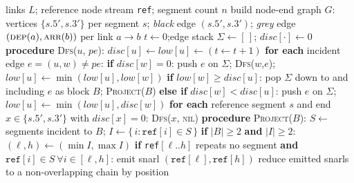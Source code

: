 \begin{algorithm}[t]
  \caption{Top-level snarl extraction via biconnected decomposition}
  \label{alg:ce-bcc}
  \begin{algorithmic}[1]
    \REQUIRE links $L$; reference node stream \texttt{ref}; segment count $n$
    \STATE build node-end graph $G$: vertices $\{s.5',s.3'\}$ per segment $s$;
           \emph{black} edge $(s.5',s.3')$; \emph{grey} edge
           $(\textsc{dep}(a),\textsc{arr}(b))$ per link $a{\to}b$
    \STATE $t \gets 0$;\quad edge stack $\Sigma \gets [\,]$;\quad
           $\textit{disc}[\cdot]\gets 0$
    \STATE \textbf{procedure} \textsc{Dfs}($u$, $\textit{pe}$): 
    \STATE \quad $\textit{disc}[u]\gets\textit{low}[u]\gets (t\gets t{+}1)$
    \STATE \quad \textbf{for each} incident edge $e=(u,w)\neq \textit{pe}$:
    \STATE \qquad \textbf{if} $\textit{disc}[w]=0$: \quad push $e$ on $\Sigma$;\;
           \textsc{Dfs}($w$,$e$);\;
           $\textit{low}[u]\gets\min(\textit{low}[u],\textit{low}[w])$
    \STATE \qquad\quad \textbf{if} $\textit{low}[w]\ge\textit{disc}[u]$:
           pop $\Sigma$ down to and including $e$ as block $B$;\; \textsc{Project}($B$)
    \STATE \qquad \textbf{else if} $\textit{disc}[w]<\textit{disc}[u]$:
           push $e$ on $\Sigma$;\; $\textit{low}[u]\gets\min(\textit{low}[u],\textit{disc}[w])$
    \STATE \textbf{for each} reference segment $s$ and end $x\in\{s.5',s.3'\}$ with $\textit{disc}[x]=0$: \textsc{Dfs}($x$, \textsc{nil})
    \STATE \textbf{procedure} \textsc{Project}($B$):
    \STATE \quad $S \gets$ segments incident to $B$;\quad
           $I \gets \{\,i : \texttt{ref}[i]\in S\,\}$
    \STATE \quad \textbf{if} $|B|\ge 2$ \textbf{and} $|I|\ge 2$:
           $(\ell,h)\gets(\min I,\max I)$
    \STATE \qquad \textbf{if} \texttt{ref}$[\ell..h]$ repeats no segment \textbf{and}
           $\texttt{ref}[i]\in S\ \forall i\in[\ell,h]$:
           emit snarl $(\texttt{ref}[\ell],\texttt{ref}[h])$
    \STATE reduce emitted snarls to a non-overlapping chain by position
  \end{algorithmic}
\end{algorithm}

